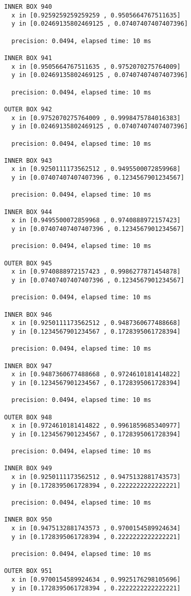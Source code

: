 \begin{verbatim}
INNER BOX 940
  x in [0.9259259259259259 , 0.9505664767511635]
  y in [0.02469135802469125 , 0.07407407407407396]

  precision: 0.0494, elapsed time: 10 ms

INNER BOX 941
  x in [0.9505664767511635 , 0.9752070275764009]
  y in [0.02469135802469125 , 0.07407407407407396]

  precision: 0.0494, elapsed time: 10 ms

OUTER BOX 942
  x in [0.9752070275764009 , 0.9998475784016383]
  y in [0.02469135802469125 , 0.07407407407407396]

  precision: 0.0494, elapsed time: 10 ms

INNER BOX 943
  x in [0.9250111173562512 , 0.9495500072859968]
  y in [0.07407407407407396 , 0.1234567901234567]

  precision: 0.0494, elapsed time: 10 ms

INNER BOX 944
  x in [0.9495500072859968 , 0.9740888972157423]
  y in [0.07407407407407396 , 0.1234567901234567]

  precision: 0.0494, elapsed time: 10 ms

OUTER BOX 945
  x in [0.9740888972157423 , 0.9986277871454878]
  y in [0.07407407407407396 , 0.1234567901234567]

  precision: 0.0494, elapsed time: 10 ms

INNER BOX 946
  x in [0.9250111173562512 , 0.9487360677488668]
  y in [0.1234567901234567 , 0.1728395061728394]

  precision: 0.0494, elapsed time: 10 ms

INNER BOX 947
  x in [0.9487360677488668 , 0.9724610181414822]
  y in [0.1234567901234567 , 0.1728395061728394]

  precision: 0.0494, elapsed time: 10 ms

OUTER BOX 948
  x in [0.9724610181414822 , 0.9961859685340977]
  y in [0.1234567901234567 , 0.1728395061728394]

  precision: 0.0494, elapsed time: 10 ms

INNER BOX 949
  x in [0.9250111173562512 , 0.9475132881743573]
  y in [0.1728395061728394 , 0.2222222222222221]

  precision: 0.0494, elapsed time: 10 ms

INNER BOX 950
  x in [0.9475132881743573 , 0.9700154589924634]
  y in [0.1728395061728394 , 0.2222222222222221]

  precision: 0.0494, elapsed time: 10 ms

OUTER BOX 951
  x in [0.9700154589924634 , 0.9925176298105696]
  y in [0.1728395061728394 , 0.2222222222222221]


\end{verbatim}
